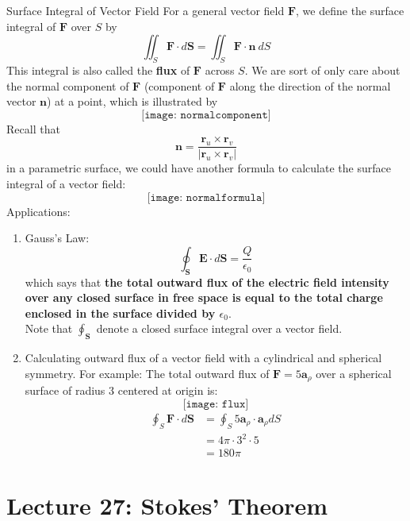 \documentclass[10pt]{beamer}
\begin{document}
\begin{frame}[allowframebreaks]{Surface Integral of Vector Field}
For a general vector field $\mathbf{F}$, we define the surface integral  of $\mathbf{F}$ over $S$ by $$\iint_S\mathbf{F}\cdot d\mathbf{S} = \iint_S\mathbf{F}\cdot \mathbf{n}~dS$$
This integral is also called the {\bf flux} of $\mathbf{F}$ across $S$.
We are sort of only care about the normal component of $\mathbf{F}$ (component of $\mathbf{F}$ along the direction of the normal vector $\mathbf{n}$) at a point, which is illustrated by
$$\texttt{[image: normalcomponent]}$$
Recall that $$\mathbf{n} = \dfrac{\mathbf{r}_u \times\mathbf{r}_v}{|\mathbf{r}_u\times\mathbf{r}_v|}$$
in a parametric surface, we could have another formula to calculate the surface integral of a vector field:
$$\texttt{[image: normalformula]}$$
\newpage
Applications:
\begin{enumerate}
	\item Gauss's Law:
	$$\oint_\mathbf{S}\mathbf{E}\cdot d\mathbf{S} = \dfrac{Q}{\epsilon_0}$$
	which says that {\bf the total outward flux of the electric field intensity over any closed surface in free space is equal to the total charge enclosed in the surface divided by $\epsilon_0$}.
	\\{\small\color{red} Note that $\oint_{\mathbf{S}}$ denote a closed surface integral over a vector field}.
	\item Calculating outward flux of a vector field with a {\color{red}cylindrical and spherical symmetry}. For example: The total outward flux of $\mathbf{F} = 5\mathbf{a}_\rho$ over a spherical surface of radius 3 centered at origin is:
	$$\texttt{[image: flux]}$$
	\begin{align*}
	\oint_S\mathbf{F}\cdot d\mathbf{S} &= \oint_S5\mathbf{a}_\rho\cdot \mathbf{a}_\rho dS
	\\&=4\pi\cdot 3^2\cdot 5
	\\&=180\pi
	\end{align*}
\end{enumerate}
	
\end{frame}



\section{Lecture 27: Stokes' Theorem}
\end{document}
